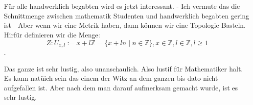 \chapter{}
Für alle handwerklich begabten wird es jetzt interessant. 
- Ich vermute das die Schnittmenge zwischen mathematik Studenten und handwerklich begabten gering ist -
Aber wenn wir eine Metrik haben, dann können wir eine Topologie Basteln. 
Hirfür definieren wir die Menge:
$$Z : U_{x,l }:= x + l\mathbb{Z} = \{x + ln \mid n \in \mathbb{Z}\}, x \in \mathbb{Z}, l\in \mathbb{Z}, l \ge 1$$.


Das ganze ist sehr lustig, also unanschaulich. Also lustif für Mathematiker halt. 
Es kann natüich sein das einem der Witz an dem ganzen bis dato nicht aufgefallen ist. 
Aber nach dem man darauf aufmerksam gemacht wurde, ist es sehr lustig.
\bigskip

